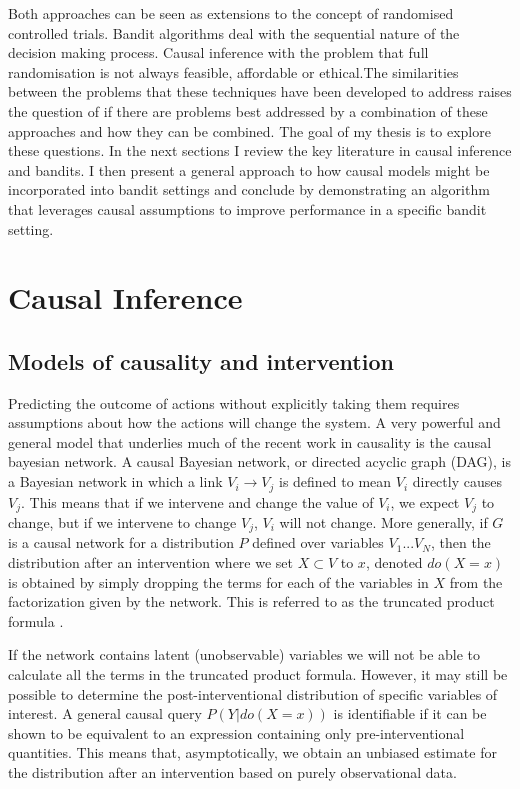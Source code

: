 \documentclass[11pt,a4paper]{article}
\begin{document}
Both approaches can be seen as extensions to the concept of randomised controlled trials. Bandit algorithms deal with the sequential nature of the decision making process. Causal inference with the problem that full randomisation is not always feasible, affordable or ethical.The similarities between the problems that these techniques have been developed to address raises the question of if there are problems best addressed by a combination of these approaches and how they can be combined. The goal of my thesis is to explore these questions. In the next sections I review the key literature in causal inference and bandits. I then present a general approach to  how causal models might be incorporated into bandit settings and conclude by demonstrating an algorithm that leverages causal assumptions to improve performance in a specific bandit setting. 

\section{Causal Inference}

\subsection{Models of causality and intervention}

Predicting the outcome of actions without explicitly taking them requires assumptions about how the actions will change the system. A very powerful and general model that underlies much of the recent work in causality is the causal bayesian network. A causal Bayesian network, or directed acyclic graph (DAG), is a Bayesian network in which a link $V_{i} \rightarrow V_{j}$ is defined to mean $V_{i}$ directly causes $V_{j}$. This means that if we intervene and change the value of $V_{i}$, we expect $V_{j}$ to change, but if we intervene to change $V_{j}$, $V_{i}$ will not change. More generally, if $G$ is a causal network for a distribution $P$ defined over variables $V_{1}...V_{N}$, then the distribution after an intervention where we set $X \subset V$ to $x$, denoted $do(X=x)$ is obtained by simply dropping the terms for each of the variables in $X$ from the factorization given by the network. This is referred to as the truncated product formula \cite{Pearl2000}. 

If the network contains latent (unobservable) variables we will not be able to calculate all the terms in the truncated product formula. However, it may still be possible to determine the post-interventional distribution of specific variables of interest. A general causal query $P(Y|do(X=x))$ is identifiable if it can be shown to be equivalent to an expression containing only pre-interventional quantities. This means that, asymptotically, we obtain an unbiased estimate for the distribution after an intervention based on purely observational data. 
\end{document}
